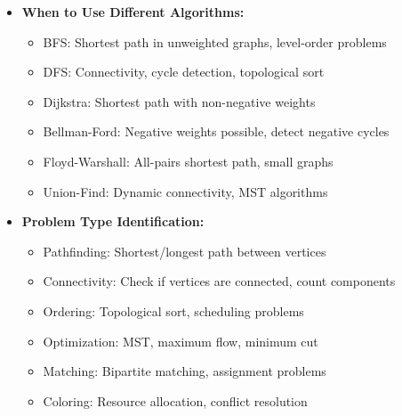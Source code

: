 \documentclass[a4paper,10pt]{book}
\begin{document}
\begin{itemize}[leftmargin=*]
    \item \textbf{When to Use Different Algorithms:}
    \begin{itemize}
        \item BFS: Shortest path in unweighted graphs, level-order problems
        \item DFS: Connectivity, cycle detection, topological sort
        \item Dijkstra: Shortest path with non-negative weights
        \item Bellman-Ford: Negative weights possible, detect negative cycles
        \item Floyd-Warshall: All-pairs shortest path, small graphs
        \item Union-Find: Dynamic connectivity, MST algorithms
    \end{itemize}

    \item \textbf{Problem Type Identification:}
    \begin{itemize}
        \item Pathfinding: Shortest/longest path between vertices
        \item Connectivity: Check if vertices are connected, count components
        \item Ordering: Topological sort, scheduling problems
        \item Optimization: MST, maximum flow, minimum cut
        \item Matching: Bipartite matching, assignment problems
        \item Coloring: Resource allocation, conflict resolution
    \end{itemize}
\end{itemize}
\end{document}
